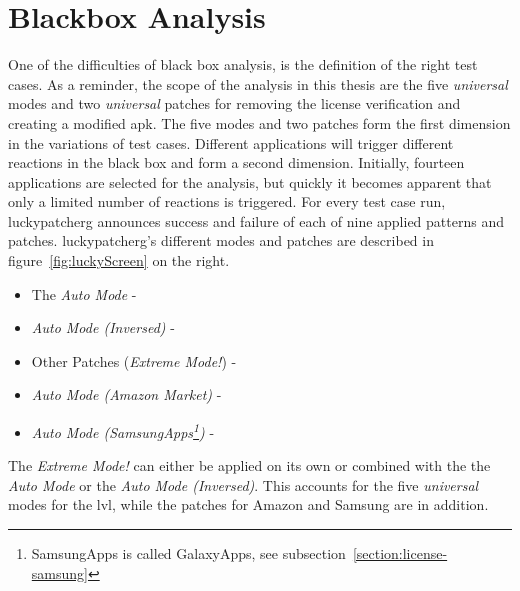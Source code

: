 \section{Blackbox Analysis} \label{section:luckypatcher-blackbox}
One of the difficulties of black box analysis, is the definition of the right test cases.
As a reminder, the scope of the analysis in this thesis are the five \textit{universal} modes and two \textit{universal} patches for removing the license verification and creating a modified \gls{apk}.
The five modes and two patches form the first dimension in the variations of test cases.
Different applications will trigger different reactions in the black box and form a second dimension.
\newline
Initially, fourteen applications are selected for the analysis, but quickly it becomes apparent that only a limited number of reactions is triggered.
For every test case run, \gls{luckypatcherg} announces success and failure of each of nine applied patterns and patches.
\newline
\gls{luckypatcherg}’s different modes and patches are described in figure~\ref{fig:luckyScreen} on the right.
\begin{itemize}
\item The \textit{Auto Mode} - \grqq
\item \textit{Auto Mode (Inversed)} - \grqq
\item Other Patches (\textit{Extreme Mode!}) - \grqq
\item \textit{Auto Mode (Amazon Market)} - \grqq
\item \textit{Auto Mode (SamsungApps\footnote[1]{SamsungApps is called GalaxyApps, see subsection~\ref{section:license-samsung}})} - \grqq
\end{itemize}
The \textit{Extreme Mode!} can either be applied on its own or combined with the the \textit{Auto Mode} or the \textit{Auto Mode (Inversed)}.
This accounts for the five \textit{universal} modes for the \gls{lvl}, while the patches for Amazon and Samsung are in addition.
